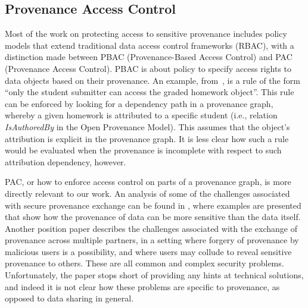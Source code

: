 \subsection{Provenance Access Control}

Most of the work on protecting access to sensitive provenance includes policy models that extend traditional data access control frameworks (RBAC), with a distinction made between PBAC (Provenance-Based Access Control) and PAC (Provenance Access Control).
%
PBAC is about policy to specify access rights to data objects based on their provenance.
%
An example, from~\citep{nguyen2012dependency}, is a rule of the form ``only the student submitter can access the graded homework object''. 
%
This rule can be enforced by looking for a dependency path in a provenance graph, whereby a given homework is attributed to a specific student (i.e., relation \textit{IsAuthoredBy} in the Open Provenance Model). This assumes that the object's attribution is explicit in the provenance graph. It is less clear how such a rule would be evaluated when the provenance is incomplete with respect to such attribution dependency, however.

PAC, or how to enforce access control on parts of a provenance graph, is more directly relevant to our work. An analysis of some of the  challenges associated with secure provenance exchange can be found in  \citep{Braun:2008:SP:1496671.1496675}, where 
examples are presented that show how the provenance of data can be more sensitive than the data itself.
%
Another position paper \citep{Hasan:2007:ISP:1314313.1314318}
describes the challenges associated with the exchange of provenance across multiple partners, in a setting where forgery of provenance by malicious users is a possibility, and where users may collude to reveal sensitive provenance to others. These are all common and complex security problems. Unfortunately, the paper stops short of providing any hints at technical solutions, and indeed it is not clear how these problems are specific to provenance, as opposed to data sharing in general.

